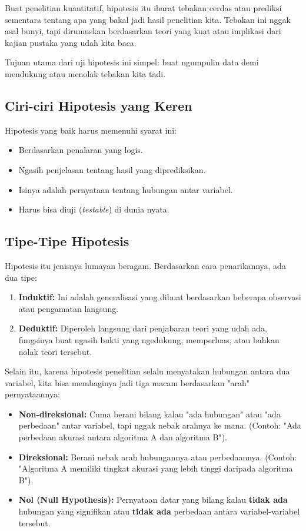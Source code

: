 \documentclass[12pt,a4paper]{article}
\begin{document}
Buat penelitian kuantitatif, hipotesis itu ibarat tebakan cerdas atau prediksi sementara tentang apa yang bakal jadi hasil penelitian kita. Tebakan ini nggak asal bunyi, tapi dirumuskan berdasarkan teori yang kuat atau implikasi dari kajian pustaka yang udah kita baca.

Tujuan utama dari uji hipotesis ini simpel: buat ngumpulin data demi mendukung atau menolak tebakan kita tadi.

\subsection{Ciri-ciri Hipotesis yang Keren}
Hipotesis yang baik harus memenuhi syarat ini:
\begin{itemize}
    \item Berdasarkan penalaran yang logis.
    \item Ngasih penjelasan tentang hasil yang diprediksikan.
    \item Isinya adalah pernyataan tentang hubungan antar variabel.
    \item Harus bisa diuji (\textit{testable}) di dunia nyata.
\end{itemize}

\subsection{Tipe-Tipe Hipotesis}
Hipotesis itu jenisnya lumayan beragam. Berdasarkan cara penarikannya, ada dua tipe:
\begin{enumerate}
    \item \textbf{Induktif:} Ini adalah generalisasi yang dibuat berdasarkan beberapa observasi atau pengamatan langsung.
    \item \textbf{Deduktif:} Diperoleh langsung dari penjabaran teori yang udah ada, fungsinya buat ngasih bukti yang ngedukung, memperluas, atau bahkan nolak teori tersebut.
\end{enumerate}

Selain itu, karena hipotesis penelitian selalu menyatakan hubungan antara dua variabel, kita bisa membaginya jadi tiga macam berdasarkan "arah" pernyataannya:
\begin{itemize}
    \item \textbf{Non-direksional:} Cuma berani bilang kalau "ada hubungan" atau "ada perbedaan" antar variabel, tapi nggak nebak arahnya ke mana. (Contoh: "Ada perbedaan akurasi antara algoritma A dan algoritma B").
    \item \textbf{Direksional:} Berani nebak arah hubungannya atau perbedaannya. (Contoh: "Algoritma A memiliki tingkat akurasi yang lebih tinggi daripada algoritma B").
    \item \textbf{Nol (Null Hypothesis):} Pernyataan datar yang bilang kalau \textbf{tidak ada} hubungan yang signifikan atau \textbf{tidak ada} perbedaan antara variabel-variabel tersebut.
\end{itemize}
\end{document}
